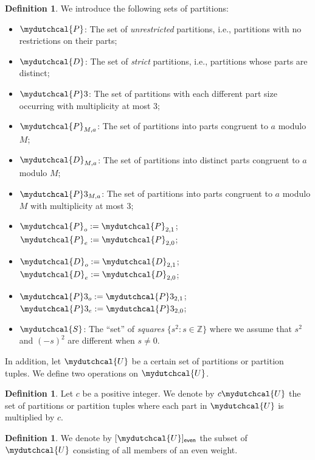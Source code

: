 \documentclass[12pt,reqno]{amsart}
\numberwithin{equation}{section}
\theoremstyle{plain}
\theoremstyle{definition}
\newtheorem{definition}[theorem]{Definition}
\theoremstyle{named}
\newcommand{\cP}{\mydutchcal{P}}
\newcommand{\cD}{\mydutchcal{D}}
\newcommand{\cS}{\mydutchcal{S}}
\newcommand{\cU}{\mydutchcal{U}}
\newcommand{\even}{\mathsf{even}}
\begin{document}
\begin{definition}
	We introduce the following sets of partitions:
	\begin{itemize}[itemindent=*, leftmargin=*,itemsep=3pt]
		\item $\cP$: The set of \emph{unrestricted} partitions, i.e., partitions with no restrictions on their parts;
		
		\item $\cD$: The set of \emph{strict} partitions, i.e., partitions whose parts are distinct;
		
		\item $\cP3$: The set of partitions with each different part size occurring with multiplicity at most $3$;
		
		\item $\cP_{M,a}$: The set of partitions into parts congruent to $a$ modulo $M$;
		
		\item $\cD_{M,a}$: The set of partitions into distinct parts congruent to $a$ modulo $M$;
		
		\item $\cP3_{M,a}$: The set of partitions into parts congruent to $a$ modulo $M$ with multiplicity at most $3$;
		
		\item $\cP_{o} := \cP_{2,1}$; $\cP_{e} := \cP_{2,0}$;
		
		\item $\cD_{o} := \cD_{2,1}$; $\cD_{e} := \cD_{2,0}$;
		
		\item $\cP3_{o} := \cP3_{2,1}$; $\cP3_{e} := \cP3_{2,0}$;
		
		\item $\cS$: The ``set'' of \emph{squares} $\{s^2:s\in \mathbb{Z}\}$ where we assume that $s^2$ and $(-s)^2$ are different when $s\ne 0$.
	\end{itemize}
\end{definition}

In addition, let $\cU$ be a certain set of partitions or partition tuples. We define two operations on $\cU$.

\begin{definition}
	Let $c$ be a positive integer. We denote by $c\cU$ the set of partitions or partition tuples where each part in $\cU$ is multiplied by $c$.
\end{definition}

\begin{definition}
	We denote by $[\cU]_\even$ the subset of $\cU$ consisting of all members of an even weight.
\end{definition}
\end{document}
